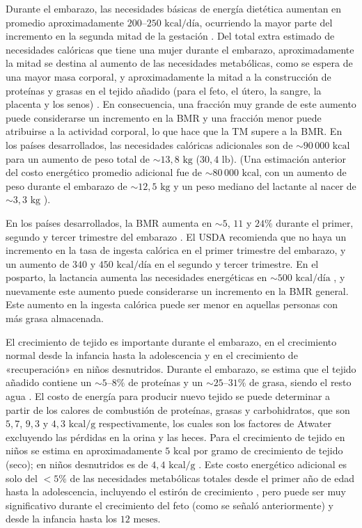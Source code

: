 \documentclass[12pt]{book}
\begin{document}
Durante el embarazo, las necesidades básicas de energía dietética aumentan en promedio aproximadamente $200\text{--}250\text{ kcal/día}$, ocurriendo la mayor parte del incremento en la segunda mitad de la gestación \cite{18,58,73,85}. Del total extra estimado de necesidades calóricas que tiene una mujer durante el embarazo, aproximadamente la mitad se destina al aumento de las necesidades metabólicas, como se espera de una mayor masa corporal, y aproximadamente la mitad a la construcción de proteínas y grasas en el tejido añadido (para el feto, el útero, la sangre, la placenta y los senos) \cite{18}. En consecuencia, una fracción muy grande de este aumento puede considerarse un incremento en la BMR y una fracción menor puede atribuirse a la actividad corporal, lo que hace que la TM supere a la BMR. En los países desarrollados, las necesidades calóricas adicionales son de $\sim 90\,000\text{ kcal}$ para un aumento de peso total de $\sim 13,8\text{ kg}$ ($30,4\text{ lb}$). (Una estimación anterior del costo energético promedio adicional fue de $\sim 80\,000\text{ kcal}$, con un aumento de peso durante el embarazo de $\sim 12,5\text{ kg}$ y un peso mediano del lactante al nacer de $\sim 3,3\text{ kg}$ \cite{33}).

En los países desarrollados, la BMR aumenta en $\sim 5$, $11$ y $24\%$ durante el primer, segundo y tercer trimestre del embarazo \cite{18}. El USDA recomienda que no haya un incremento en la tasa de ingesta calórica en el primer trimestre del embarazo, y un aumento de $340$ y $450\text{ kcal/día}$ en el segundo y tercer trimestre. En el posparto, la lactancia aumenta las necesidades energéticas en $\sim 500\text{ kcal/día}$ \cite{73}, y nuevamente este aumento puede considerarse un incremento en la BMR general. Este aumento en la ingesta calórica puede ser menor en aquellas personas con más grasa almacenada.

El crecimiento de tejido es importante durante el embarazo, en el crecimiento normal desde la infancia hasta la adolescencia y en el crecimiento de «recuperación» en niños desnutridos. Durante el embarazo, se estima que el tejido añadido contiene un $\sim 5\text{--}8\%$ de proteínas y un $\sim 25\text{--}31\%$ de grasa, siendo el resto agua \cite{18,85}. El costo de energía para producir nuevo tejido se puede determinar a partir de los calores de combustión de proteínas, grasas y carbohidratos, que son $5,7$, $9,3$ y $4,3\text{ kcal/g}$ respectivamente, los cuales son los factores de Atwater excluyendo las pérdidas en la orina y las heces. Para el crecimiento de tejido en niños se estima en aproximadamente $5\text{ kcal}$ por gramo de crecimiento de tejido (seco); en niños desnutridos es de $4,4\text{ kcal/g}$ \cite{94}. Este costo energético adicional es solo del $<5\%$ de las necesidades metabólicas totales desde el primer año de edad hasta la adolescencia, incluyendo el estirón de crecimiento \cite{17}, pero puede ser muy significativo durante el crecimiento del feto (como se señaló anteriormente) y desde la infancia hasta los $12\text{ meses}$.
\end{document}
